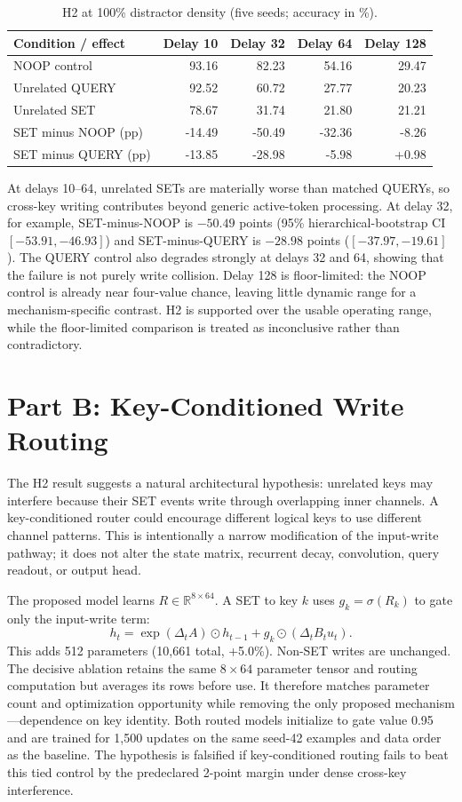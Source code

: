 \documentclass[10pt,a4paper]{article}
\begin{document}
\begin{table}[!htbp]
\centering\small
\caption{H2 at 100\% distractor density (five seeds; accuracy in \%).}
\begin{tabular}{lrrrr}
\toprule
Condition / effect & Delay 10 & Delay 32 & Delay 64 & Delay 128 \\
\midrule
NOOP control & 93.16 & 82.23 & 54.16 & 29.47 \\
Unrelated QUERY & 92.52 & 60.72 & 27.77 & 20.23 \\
Unrelated SET & 78.67 & 31.74 & 21.80 & 21.21 \\
SET minus NOOP (pp) & -14.49 & \cellcolor{softred}-50.49 & -32.36 & -8.26 \\
SET minus QUERY (pp) & -13.85 & -28.98 & -5.98 & +0.98 \\
\bottomrule
\end{tabular}
\end{table}
At delays 10--64, unrelated SETs are materially worse than matched QUERYs, so cross-key writing contributes beyond generic active-token processing. At delay 32, for example, SET-minus-NOOP is \(-50.49\) points (95\% hierarchical-bootstrap CI \([-53.91,-46.93]\)) and SET-minus-QUERY is \(-28.98\) points (\([-37.97,-19.61]\)). The QUERY control also degrades strongly at delays 32 and 64, showing that the failure is not purely write collision. Delay 128 is floor-limited: the NOOP control is already near four-value chance, leaving little dynamic range for a mechanism-specific contrast. H2 is supported over the usable operating range, while the floor-limited comparison is treated as inconclusive rather than contradictory.

\section{Part B: Key-Conditioned Write Routing}
The H2 result suggests a natural architectural hypothesis: unrelated keys may interfere because their SET events write through overlapping inner channels. A key-conditioned router could encourage different logical keys to use different channel patterns. This is intentionally a narrow modification of the input-write pathway; it does not alter the state matrix, recurrent decay, convolution, query readout, or output head.

The proposed model learns \(R\in\mathbb R^{8\times64}\). A SET to key \(k\) uses \(g_k=\sigma(R_k)\) to gate only the input-write term:
\begin{equation}
h_t=\exp(\Delta_tA)\odot h_{t-1}+g_k\odot(\Delta_tB_tu_t).
\end{equation}
This adds 512 parameters (10,661 total, +5.0\%). Non-SET writes are unchanged. The decisive ablation retains the same \(8\times64\) parameter tensor and routing computation but averages its rows before use. It therefore matches parameter count and optimization opportunity while removing the only proposed mechanism---dependence on key identity. Both routed models initialize to gate value 0.95 and are trained for 1,500 updates on the same seed-42 examples and data order as the baseline. The hypothesis is falsified if key-conditioned routing fails to beat this tied control by the predeclared 2-point margin under dense cross-key interference.
\end{document}
